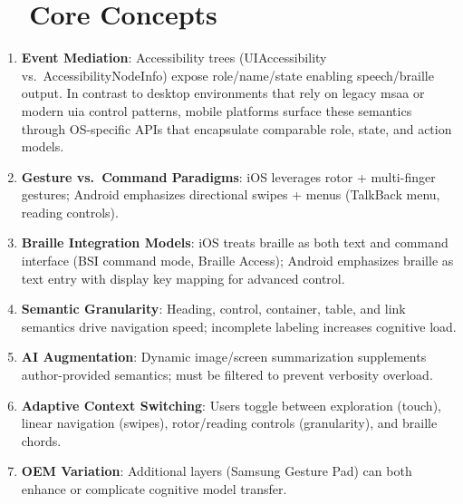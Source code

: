 \section{~~Core Concepts}
\label{sec:sr26-core-concepts}
\begin{enumerate}
	\item \textbf{Event Mediation}: Accessibility trees (UIAccessibility vs.\ AccessibilityNodeInfo) expose role/name/state enabling speech/braille output. In contrast to desktop environments that rely on legacy \gls{msaa} or modern \gls{uia} control patterns, mobile platforms surface these semantics through OS-specific APIs that encapsulate comparable role, state, and action models.
	\item \textbf{Gesture vs.\ Command Paradigms}: iOS leverages rotor + multi-finger gestures; Android emphasizes directional swipes + menus (TalkBack menu, reading controls).
	\item \textbf{Braille Integration Models}: iOS treats braille as both text and command interface (BSI command mode, Braille Access); Android emphasizes braille as text entry with display key mapping for advanced control.
	\item \textbf{Semantic Granularity}: Heading, control, container, table, and link semantics drive navigation speed; incomplete labeling increases cognitive load.
	\item \textbf{AI Augmentation}: Dynamic image/screen summarization supplements author-provided semantics; must be filtered to prevent verbosity overload.
	\item \textbf{Adaptive Context Switching}: Users toggle between exploration (touch), linear navigation (swipes), rotor/reading controls (granularity), and braille chords.
	\item \textbf{OEM Variation}: Additional layers (Samsung Gesture Pad) can both enhance or complicate cognitive model transfer.
\end{enumerate}

